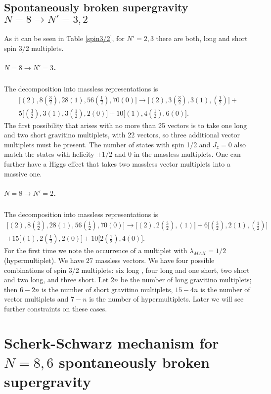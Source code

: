 \documentclass[a4paper,12pt]{article}
\begin{document}
\subsection{Spontaneously broken  supergravity  $N=8\rightarrow N'=3,2$\label{8to32}}
As it can be seen in Table \ref{spin3/2}, for $N'=2,3$ there are both, long and short spin 3/2 multiplets.

\subparagraph{$N=8\rightarrow N'=3$.} The decomposition into massless representations is
\begin{eqnarray*}\bigl[ (2), 8(\frac{3}{2}), 28(1), 56(\frac{1}{2}), 70(0)\bigr]\rightarrow
\bigl[ (2), 3(\frac{3}{2}), 3(1), (\frac{1}{2})\bigr]+\\ 5\bigl[
(\frac{3}{2}), 3(1), 3(\frac{1}{2}), 2(0)\bigr]+10\bigl[ (1),
4(\frac{1}{2}), 6(0)\bigr].\end{eqnarray*} The first possibility
that arises  with no more than  25 vectors is to take one long and
two short gravitino multiplets, with 22 vectors, so three
additional vector multiplets must be present. The number of states
with spin 1/2 and $J_z=0$ also match the states with  helicity
$\pm 1/2$ and 0 in the massless multiplets. One can further have a
Higgs effect that takes two massless  vector multiplets into a
massive one.

\subparagraph{$N=8\rightarrow N'=2$.} The decomposition into massless representations is
\begin{eqnarray*}\bigl[ (2), 8(\frac{3}{2}), 28(1), 56(\frac{1}{2}), 70(0)\bigr]\rightarrow
\bigl[ (2), 2(\frac{3}{2}), (1)\bigr]+ 6\bigl[(\frac{3}{2}), 2(1),
(\frac{1}{2})\bigr]\\+15\bigl[ (1), 2(\frac{1}{2}), 2(0)\bigr]+10
\bigl[ 2(\frac{1}{2}), 4(0)\bigr].\end{eqnarray*} For the first
time we note the occurrence of a multiplet with
$\lambda_{MAX}=1/2$ (hypermultiplet). We have 27 massless vectors.
We have   four possible combinations of spin 3/2 multiplets: six
long , four  long and one short, two short and two  long, and
three short. Let $2n$ be the number of long gravitino  multiplets;
then $6-2n$ is the number of short gravitino multiplets, $15-4n$
is the number of vector multiplets and $7-n$ is the number of
hypermultiplets. Later we will see further constraints on these
cases.

\section{Scherk-Schwarz mechanism for $N=8,6$ spontaneously broken supergravity\label{ssbreak}}
\end{document}

